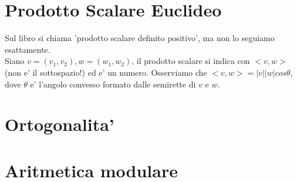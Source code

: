 \documentclass{report}
\begin{document}
\chapter{Prodotto Scalare Euclideo}
Sul libro si chiama 'prodotto scalare definito positivo', ma non lo seguiamo esattamente.\\
Siano $ v=(v_1,v_2), w=(w_1,w_2) $, il prodotto scalare si indica con $ <v,w> $ (non e' il sottospazio!) ed e' un numero. Osserviamo che $ <v,w> = |v||w|cos\theta $, dove $ \theta $ e' l'angolo convesso formato dalle semirette di $ v $ e $ w $.
\chapter{Ortogonalita'}
\chapter{Aritmetica modulare}
\end{document}

